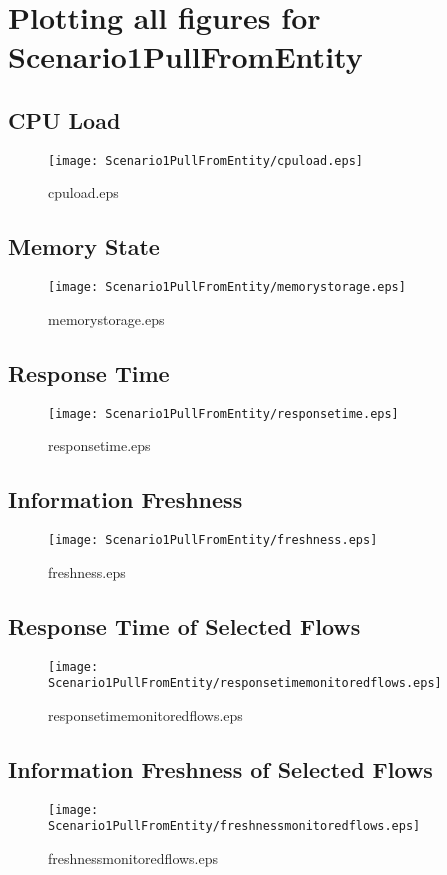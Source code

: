 \documentclass{elsart}
\begin{document}
\section{Plotting all figures for Scenario1PullFromEntity}
\subsection{CPU Load}

\begin{figure}[ht]
\centering
\texttt{[image: Scenario1PullFromEntity/cpuload.eps]}
\caption{cpuload.eps}\label{fig:cpuload}
\end{figure}

\clearpage
\subsection{Memory State}

\begin{figure}[ht]
\centering
\texttt{[image: Scenario1PullFromEntity/memorystorage.eps]}
\caption{memorystorage.eps}\label{fig:memorystorage}
\end{figure}

\clearpage
\subsection{Response Time}

\begin{figure}[ht]
\centering
\texttt{[image: Scenario1PullFromEntity/responsetime.eps]}
\caption{responsetime.eps}\label{fig:responsetime}
\end{figure}

\clearpage
\subsection{Information Freshness}

\begin{figure}[ht]
\centering
\texttt{[image: Scenario1PullFromEntity/freshness.eps]}
\caption{freshness.eps}\label{fig:freshness}
\end{figure}

\clearpage
\subsection{Response Time of Selected Flows}

\begin{figure}[ht]
\centering
\texttt{[image: Scenario1PullFromEntity/responsetimemonitoredflows.eps]}
\caption{responsetimemonitoredflows.eps}\label{fig:responsetimemonitoredflows}
\end{figure}

\clearpage
\subsection{Information Freshness of Selected Flows}

\begin{figure}[ht]
\centering
\texttt{[image: Scenario1PullFromEntity/freshnessmonitoredflows.eps]}
\caption{freshnessmonitoredflows.eps}\label{fig:freshnessmonitoredflows}
\end{figure}

\clearpage
\end{document}
